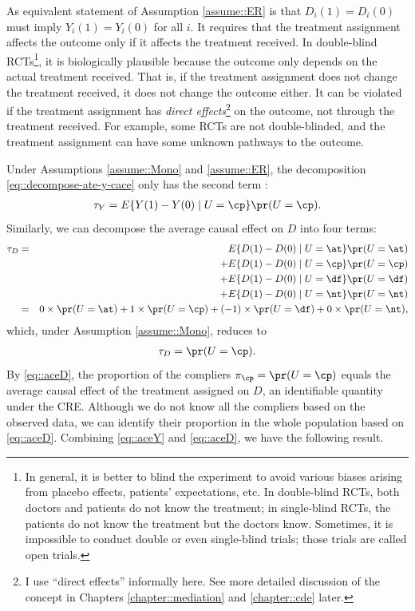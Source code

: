 As equivalent statement of Assumption \ref{assume::ER} is that $D_i(1) =  D_i(0)$ must imply $Y_i(1) =  Y_i(0)$ for all $i$.  It requires that the treatment assignment affects the outcome only if it affects the treatment received. In double-blind RCTs\footnote{In general, it is better to blind the experiment to avoid various biases arising from placebo effects, patients' expectations, etc. In double-blind RCTs, both doctors and patients do not know the treatment; in single-blind RCTs, the patients do not know the treatment but the doctors know. Sometimes, it is impossible to conduct double or even single-blind trials; those trials are called open trials.}, it is biologically plausible because the outcome only depends on the actual treatment received. That is, if the treatment assignment does not change the treatment received, it does not change the outcome either.  It can be violated if the treatment assignment has {\it direct effects}\footnote{I use ``direct effects'' informally here. See more detailed discussion of the concept in Chapters \ref{chapter::mediation} and \ref{chapter::cde} later.} on the outcome, not through the treatment received. For example, some RCTs are not double-blinded, and the treatment assignment can have some unknown pathways to the outcome. 





Under Assumptions  \ref{assume::Mono} and \ref{assume::ER}, the decomposition \eqref{eq::decompose-ate-y-cace} only has the second term :
\begin{eqnarray}
\label{eq::aceY}
\tau_Y  = E\{ Y(1) - Y(0) \mid U=\cp   \} \pr(U = \cp ).
\end{eqnarray}
Similarly, we can decompose the average causal effect on $D$ into four terms:
\begin{eqnarray*}
\tau_D &=& E\{ D(1) - D(0) \mid U=\at  \} \pr(U = \at ) \\
&&+ E\{ D(1) - D(0) \mid U=\cp   \} \pr(U = \cp ) \\
&&+ E\{ D(1) - D(0) \mid U=\df  \} \pr(U = \df ) \\
&&+ E\{ D(1) - D(0) \mid U=\nt  \} \pr(U = \nt )  \\
&=& 0\times \pr(U = \at ) 
+ 1 \times \pr(U = \cp ) 
+ (-1)\times   \pr(U = \df )
+ 0 \times  \pr(U = \nt ) ,
\end{eqnarray*}
which, under Assumption \ref{assume::Mono}, reduces to
\begin{eqnarray}
\label{eq::aceD}
\tau_D  = \pr(U = \cp ) .
\end{eqnarray}
By \eqref{eq::aceD}, the proportion of the compliers $\pi_\cp = \pr(U = \cp)$ equals the average causal effect of the treatment assigned on $D$, an identifiable quantity under the CRE. Although we do not know all the compliers based on the observed data,  we can identify their proportion in the whole population based on \eqref{eq::aceD}. 
Combining \eqref{eq::aceY} and \eqref{eq::aceD}, we have the following result.



